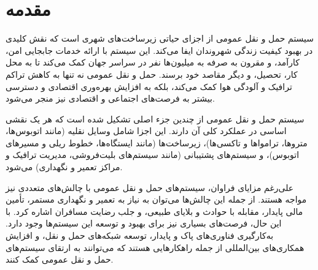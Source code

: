 \chapter{مقدمه}
سیستم حمل و نقل عمومی از اجزای حیاتی زیرساخت‌های شهری است که نقش کلیدی در بهبود کیفیت زندگی شهروندان ایفا می‌کند. این سیستم با ارائه خدمات جابجایی امن، کارآمد، و مقرون به صرفه به میلیون‌ها نفر در سراسر جهان کمک می‌کند تا به محل کار، تحصیل، و دیگر مقاصد خود برسند. حمل و نقل عمومی نه تنها به کاهش تراکم ترافیک و آلودگی هوا کمک می‌کند، بلکه به افزایش بهره‌وری اقتصادی و دسترسی بیشتر به فرصت‌های اجتماعی و اقتصادی نیز منجر می‌شود\cite{beirao2007}.


سیستم حمل و نقل عمومی از چندین جزء اصلی تشکیل شده است که هر یک نقشی اساسی در عملکرد کلی آن دارند. این اجزا شامل وسایل نقلیه (مانند اتوبوس‌ها، متروها، ترامواها و تاکسی‌ها)، زیرساخت‌ها (مانند ایستگاه‌ها، خطوط ریلی و مسیرهای اتوبوس)، و سیستم‌های پشتیبانی (مانند سیستم‌های بلیت‌فروشی، مدیریت ترافیک و مراکز تعمیر و نگهداری) می‌شود.


علی‌رغم مزایای فراوان، سیستم‌های حمل و نقل عمومی با چالش‌های متعددی نیز مواجه هستند. از جمله این چالش‌ها می‌توان به نیاز به تعمیر و نگهداری مستمر، تأمین مالی پایدار، مقابله با حوادث و بلایای طبیعی، و جلب رضایت مسافران اشاره کرد. با این حال، فرصت‌های بسیاری نیز برای بهبود و توسعه این سیستم‌ها وجود دارد. به‌کارگیری فناوری‌های پاک و پایدار، توسعه شبکه‌های حمل و نقل، و افزایش همکاری‌های بین‌المللی از جمله راهکارهایی هستند که می‌توانند به ارتقای سیستم‌های حمل و نقل عمومی کمک کنند.